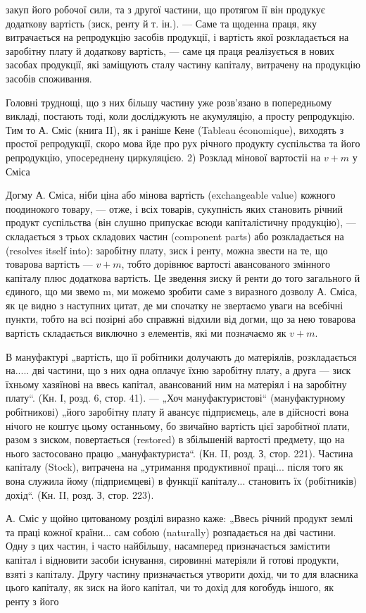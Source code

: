 \parcont{}  %
закуп його робочої сили, та з другої частини, що протягом її він продукує
додаткову вартість (зиск, ренту й т. ін.). — Саме та щоденна праця,
яку витрачається на репродукцію засобів продукції, і вартість якої
розкладається на заробітну плату й додаткову вартість, — саме ця праця
реалізується в нових засобах продукції, які заміщують сталу частину
капіталу, витрачену на продукцію засобів споживання.

Головні труднощі, що з них більшу частину уже розв’язано в попередньому
викладі, постають тоді, коли досліджують не акумуляцію, а просту
репродукцію. Тим то А. Сміс (книга II), як і раніше Кене (Tableau
économique), виходять з простої репродукції, скоро мова йде про рух
річного продукту суспільства та його репродукцію, упосереднену циркуляцією.
2) Розклад мінової вартостіі на $v + m$ у Сміса

Догму А. Сміса, ніби ціна або мінова вартість (exchangeable value)
кожного поодинокого товару, — отже, і всіх товарів, сукупність яких
становить річний продукт суспільства (він слушно припускає всюди капіталістичну
продукцію), — складається з трьох складових частин (component
parts) або розкладається на (resolves itself into): заробітну плату,
зиск і ренту, можна звести на те, що товарова вартість — $v + m$, тобто
дорівнює вартості авансованого змінного капіталу плюс додаткова вартість.
Це зведення зиску й ренти до того загального й єдиного, що
ми звемо m, ми можемо зробити саме з виразного дозволу А. Сміса, як
це видно з наступних цитат, де ми спочатку не звертаємо уваги на всебічні
пункти, тобто на всі позірні або справжні відхили від догми, що за
нею товарова вартість складається виключно з елементів, які ми позначаємо
як $v + m$.

В мануфактурі „вартість, що її робітники долучають до матеріялів,
розкладається на..... дві частини, що з них одна оплачує їхню заробітну
плату, а друга — зиск їхньому хазяїнові на ввесь капітал, авансований ним
на матеріял і на заробітну плату“. (Кн. І, розд. 6, стор. 41). — „Хоч
мануфактуристові“ (мануфактурному робітникові) „його заробітну плату
й авансує підприємець, але в дійсності вона нічого не коштує цьому
останньому, бо звичайно вартість цієї заробітної плати, разом з зиском,
повертається (restored) в збільшеній вартості предмету, що на нього застосовано
працю „мануфактуриста“. (Кн. II, розд. З, стор. 221). Частина капіталу
(Stock), витрачена на „утримання продуктивної праці... після того як вона
служила йому (підприємцеві) в функції капіталу... становить їх (робітників)
дохід“. (Кн. II, розд. З, стор. 223).

А. Сміс у щойно цитованому розділі виразно каже: „Ввесь річний
продукт землі та праці кожної країни... сам собою (naturally) розпадається
на дві частини. Одну з цих частин, і часто найбільшу, насамперед
призначається замістити капітал і відновити засоби існування, сировинні
матеріяли й готові продукти, взяті з капіталу. Другу частину призначається
утворити дохід, чи то для власника цього капіталу, як зиск на
його капітал, чи то дохід для когобудь іншого, як ренту з його
\parbreak{}  %
